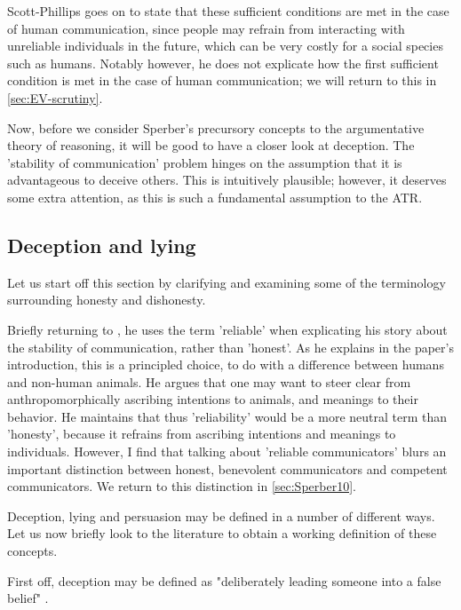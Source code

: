 Scott-Phillips goes on to state that these sufficient conditions are met in the case of human communication, since people may refrain from interacting with unreliable individuals in the future, which can be very costly for a social species such as humans.
Notably however, he does not explicate how the first sufficient condition is met in the case of human communication; we will return to this in \cref{sec:EV-scrutiny}.

Now, before we consider Sperber's precursory concepts to the argumentative theory of reasoning, it will be good to have a closer look at deception. The 'stability of communication' problem hinges on the assumption that it is advantageous to deceive others. This is intuitively plausible; however, it deserves some extra attention, as this is such a fundamental assumption to the ATR.

\subsection{Deception and lying}
\label{sec:deception}

Let us start off this section by clarifying and examining some of the terminology surrounding honesty and dishonesty.

Briefly returning to \citet{Scott-Phillips08}, he uses the term 'reliable' when explicating his story about the stability of communication, rather than 'honest'. As he explains in the paper's introduction, this is a principled choice, to do with a difference between humans and non-human animals. He argues that one may want to steer clear from anthropomorphically ascribing intentions to animals, and meanings to their behavior. He maintains that thus 'reliability' would be a more neutral term than 'honesty', because it refrains from ascribing intentions and meanings to individuals.
However, I find that talking about 'reliable communicators' blurs an important distinction between honest, benevolent communicators and competent communicators. We return to this distinction in \cref{sec:Sperber10}.

Deception, lying and persuasion may be defined in a number of different ways. Let us now briefly look to the literature to obtain a working definition of these concepts.

First off, deception may be defined as "deliberately leading someone into a false belief" \citep[p.~358]{Meibauer18}.

